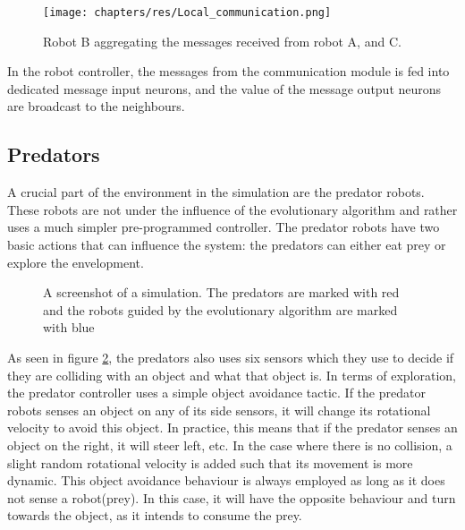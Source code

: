 	\begin{figure}[H]
		\centering
		\texttt{[image: chapters/res/Local\_communication.png]}
		\caption{Robot B aggregating the messages received from robot A, and C.}
		\label{fig:local_communication}
	\end{figure}
	
	In the robot controller, the messages from the communication module is fed into dedicated message input neurons, and the value of the message output neurons are broadcast to the neighbours.

		
\subsection{Predators}
A crucial part of the environment in the simulation are the predator robots.
These robots are not under the influence of the evolutionary algorithm and rather uses a much simpler pre-programmed controller.
The predator robots have two basic actions that can influence the system: the predators can either eat prey or explore the envelopment.

\begin{figure}[H]
		\centering
		\caption{A screenshot of a simulation. The predators are marked with red and the robots guided by the evolutionary algorithm are marked with blue}
		\label{fig:predator_screendump}
	\end{figure}

As seen in figure \ref{fig:predator_screendump}, the predators also uses six sensors which they use to decide if they are colliding with an object and what that object is.	
In terms of exploration, the predator controller uses a simple object avoidance tactic.
If the predator robots senses an object on any of its side sensors, it will change its rotational velocity to avoid this object.
In practice, this means that if the predator senses an object on the right, it will steer left, etc.
In the case where there is no collision, a slight random rotational velocity is added such that its movement is more dynamic.
This object avoidance behaviour is always employed as long as it does not sense a robot(prey).
In this case, it will have the opposite behaviour and turn towards the object, as it intends to consume the prey.

